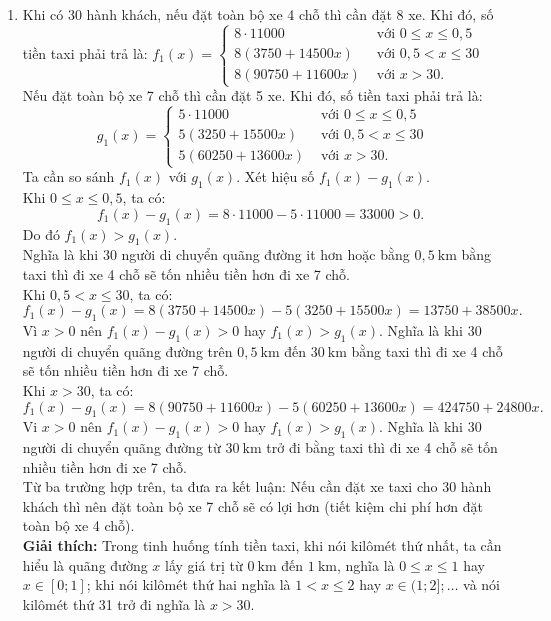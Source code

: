 \begin{ex}
{\begin{enumerate}
$$        $$
\item  Khi có 30 hành khách, nếu đặt toàn bộ xe 4 chỗ thì cần đặt 8 xe. Khi đó, số tiền taxi phải trả là: $f_{1}(x)= \begin{cases}8\cdot11000 & \text { với } 0 \leq x \leq 0{,}5 \\ 8(3750+14500 x) & \text { với } 0{,}5<x \leq 30 \\ 8(90750+11600 x) & \text { với } x>30 .\end{cases}$\\
Nếu đặt toàn bộ xe 7 chỗ thì cần đặt 5 xe. Khi đó, số tiền taxi phải trả là:
$$
g_{1}(x)= \begin{cases}5\cdot11000 & \text { với } 0 \leq x \leq 0{,}5 \\ 5(3250+15500 x) & \text { với } 0{,}5<x \leq 30 \\ 5(60250+13600 x) & \text { với } x>30 .\end{cases}
$$
Ta cần so sánh $f_{1}(x)$ với $g_{1}(x)$.
Xét hiệu số $f_{1}(x)-g_{1}(x)$.\\
Khi $0 \leq x \leq 0,5$, ta có:
$$
f_{1}(x)-g_{1}(x)=8\cdot11000-5\cdot11000=33000>0 \text {. }
$$
Do đó $f_{1}(x)>g_{1}(x)$.\\
Nghĩa là khi 30 người di chuyển quãng đường it hơn hoặc bằng $0,5 \mathrm{~km}$ bằng taxi thì đi xe 4 chỗ sẽ tốn nhiều tiền hơn đi xe 7 chỗ.\\
 Khi $0{,}5<x \leq 30$, ta có:
$$
f_{1}(x)-g_{1}(x)=8(3750+14500 x)-5(3250+15500 x)=13750+38500 x .
$$
Vì $x>0$ nên $f_1(x)-g_1(x)>0$ hay $f_1(x)>g_{1}(x)$.
Nghĩa là khi 30 người di chuyển quãng đường trên $0{,}5 \mathrm{~km}$ đến $30 \mathrm{~km}$ bằng taxi thì đi xe 4 chỗ sẽ tốn nhiều tiền hơn đi xe 7 chỗ.\\
Khi $x>30$, ta có:
$$
f_1(x)-g_1(x)=8(90750+11600 x)-5(60250+13600 x)=424750+24800x.
$$
Vi $x>0$ nên $f_1(x)-g_1(x)>0$ hay $f_1(x)>g_1(x)$.
Nghĩa là khi 30 người di chuyển quãng đường từ $30 \mathrm{~km}$ trở đi bằng taxi thì đi xe 4 chỗ sẽ tốn nhiều tiền hơn đi xe 7 chỗ.\\
Từ ba trường hợp trên, ta đưa ra kết luận: Nếu cần đặt xe taxi cho 30 hành khách thì nên đặt toàn bộ xe 7 chỗ sẽ có lợi hơn (tiết kiệm chi phí hơn đặt toàn bộ xe 4 chỗ).\\
\textbf{Giải thích:} Trong tinh huống tính tiền taxi, khi nói kilômét thứ nhất, ta cần hiểu là quãng đường $x$ lấy giá trị từ $0 \mathrm{~km}$ đến $1 \mathrm{~km}$, nghĩa là $0 \leq x \leq 1$ hay $x \in[0 ; 1]$; khi nói kilômét thứ hai nghĩa là $1<x \leq 2$ hay $x \in(1 ; 2] ; \ldots$ và nói kilômét thứ 31 trở đi nghĩa là $x>30$.
        \end{enumerate}
}
\end{ex}

